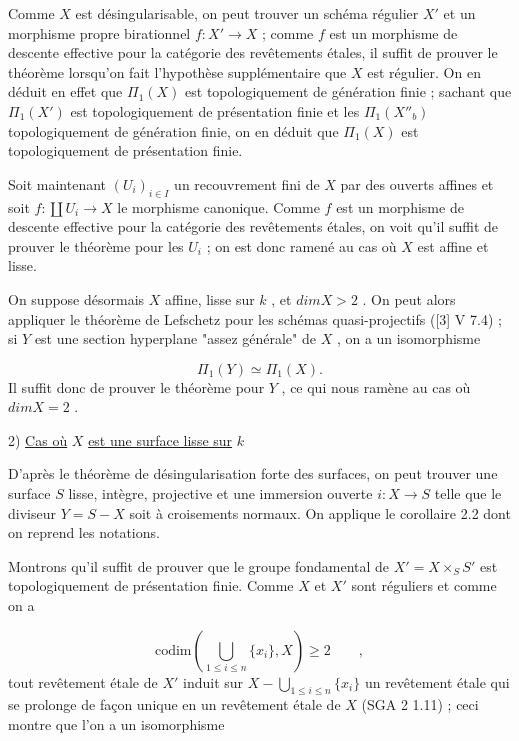 Comme $X$ est désingularisable, on peut trouver un schéma régulier $X'$ et un morphisme propre birationnel $f : X' \longrightarrow X$ ; comme $f$ est un morphisme de descente effective pour la catégorie des revêtements étales, il suffit de prouver le théorème lorsqu'on fait l'hypothèse supplémentaire que $X$ est régulier. On en déduit en effet que $\Pi_1(X)$ est topologiquement de génération finie ; sachant que $\Pi_1(X')$ est topologiquement de présentation finie et les $\Pi_1(X''_b)$ topologiquement de génération finie, on en déduit que $\Pi_1(X)$ est topologiquement de présentation finie.

Soit maintenant $(U_i)_{i \in I}$ un recouvrement fini de $X$ par des ouverts affines et soit $f : \coprod U_i \longrightarrow X$ le morphisme canonique. Comme $f$ est un morphisme de descente effective pour la catégorie des revêtements étales, on voit qu'il suffit de prouver le théorème pour les $U_i$ ; on est donc ramené au cas où $X$ est affine et lisse.

On suppose désormais $X$ affine, lisse sur $k$ , et $dim X > 2$ . On peut alors appliquer le théorème de Lefschetz pour les schémas quasi-projectifs ([3] V 7.4) ; si $Y$ est une section hyperplane "assez générale" de $X$ , on a un isomorphisme

\begin{equation*}
\Pi_1(Y) \simeq \Pi_1(X) .
\end{equation*}
Il suffit donc de prouver le théorème pour $Y$ , ce qui nous ramène au cas où $dim X = 2$ .


2) \underline{Cas où} $X$ \underline{est une surface lisse sur} $k$

D'après le théorème de désingularisation forte des surfaces, on peut trouver une surface $S$ lisse, intègre, projective et une immersion ouverte $i : X \longrightarrow S$ telle que le diviseur $Y = S - X$ soit à croisements normaux. On applique le corollaire 2.2 dont on reprend les notations.


Montrons qu'il suffit de prouver que le groupe fondamental de $X' = X\times_S S'$ est topologiquement de présentation finie. Comme $X$ et $X'$ sont réguliers et comme on a

\begin{equation*}
\mathrm{codim}\left(\bigcup_{1\leqslant i\leqslant n} \{x_i\},X\right) \geqslant 2 \qquad ,
\end{equation*}
tout revêtement étale de $X'$ induit sur $X- \bigcup_{1\leqslant i\leqslant n}\{x_i\}$ un revêtement étale qui se prolonge de façon unique en un revêtement étale de $X$ (SGA 2 1.11) ; ceci montre que l'on a un isomorphisme

